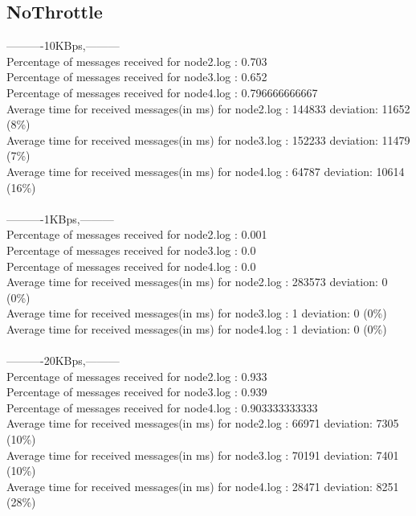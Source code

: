     \subsection{NoThrottle}\label{RawResults:NoThrottle}
        ----------10KBps,---------\\
        Percentage of messages received for node2.log : 0.703\\
        Percentage of messages received for node3.log : 0.652\\
        Percentage of messages received for node4.log : 0.796666666667\\
        Average time for received messages(in ms) for  node2.log : 144833 	deviation: 11652 (8\%)\\
        Average time for received messages(in ms) for  node3.log : 152233 	deviation: 11479 (7\%)\\
        Average time for received messages(in ms) for  node4.log : 64787 	deviation: 10614 (16\%)\\\\
        ----------1KBps,---------\\
        Percentage of messages received for node2.log : 0.001\\
        Percentage of messages received for node3.log : 0.0\\
        Percentage of messages received for node4.log : 0.0\\
        Average time for received messages(in ms) for  node2.log : 283573 	deviation: 0 (0\%)\\
        Average time for received messages(in ms) for  node3.log : 1 	deviation: 0 (0\%)\\
        Average time for received messages(in ms) for  node4.log : 1 	deviation: 0 (0\%)\\\\
        ----------20KBps,---------\\
        Percentage of messages received for node2.log : 0.933\\
        Percentage of messages received for node3.log : 0.939\\
        Percentage of messages received for node4.log : 0.903333333333\\
        Average time for received messages(in ms) for  node2.log : 66971 	deviation: 7305 (10\%)\\
        Average time for received messages(in ms) for  node3.log : 70191 	deviation: 7401 (10\%)\\
        Average time for received messages(in ms) for  node4.log : 28471 	deviation: 8251 (28\%)\\\\
